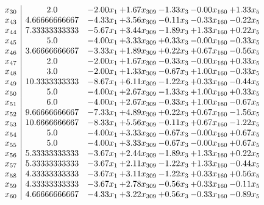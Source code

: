 \documentclass[8pt]{article}
\begin{document}
\[\begin{array}{c| c c@{\hskip 2pt} c@{\hskip 2pt} c@{\hskip 2pt} c@{\hskip 2pt} c@{\hskip 2pt} }
 x_{30}   &  2.0 & -2.00 x_{1} & +  1.67 x_{309} & -1.33 x_{3} & -0.00 x_{160} & +  1.33 x_{5}\\
 x_{43}   &  4.66666666667 & -4.33 x_{1} & +  3.56 x_{309} & -0.11 x_{3} & -0.33 x_{160} & -0.22 x_{5}\\
 x_{44}   &  7.33333333333 & -5.67 x_{1} & +  3.44 x_{309} & -1.89 x_{3} & +  1.33 x_{160} & +  0.22 x_{5}\\
 x_{45}   &  5.0 & -4.00 x_{1} & +  3.33 x_{309} & +  0.33 x_{3} & -0.00 x_{160} & -0.33 x_{5}\\
 x_{46}   &  3.66666666667 & -3.33 x_{1} & +  1.89 x_{309} & +  0.22 x_{3} & +  0.67 x_{160} & -0.56 x_{5}\\
 x_{47}   &  2.0 & -2.00 x_{1} & +  1.67 x_{309} & -0.33 x_{3} & -0.00 x_{160} & +  0.33 x_{5}\\
 x_{48}   &  3.0 & -2.00 x_{1} & +  1.33 x_{309} & -0.67 x_{3} & +  1.00 x_{160} & -0.33 x_{5}\\
 x_{49}   &  10.3333333333 & -8.67 x_{1} & +  6.11 x_{309} & -1.22 x_{3} & +  0.33 x_{160} & -0.44 x_{5}\\
 x_{50}   &  5.0 & -4.00 x_{1} & +  2.67 x_{309} & -1.33 x_{3} & +  1.00 x_{160} & +  0.33 x_{5}\\
 x_{51}   &  6.0 & -4.00 x_{1} & +  2.67 x_{309} & -0.33 x_{3} & +  1.00 x_{160} & -0.67 x_{5}\\
 x_{52}   &  9.66666666667 & -7.33 x_{1} & +  4.89 x_{309} & +  0.22 x_{3} & +  0.67 x_{160} & -1.56 x_{5}\\
 x_{53}   &  10.6666666667 & -8.33 x_{1} & +  5.56 x_{309} & -0.11 x_{3} & +  0.67 x_{160} & -1.22 x_{5}\\
 x_{54}   &  5.0 & -4.00 x_{1} & +  3.33 x_{309} & -0.67 x_{3} & -0.00 x_{160} & +  0.67 x_{5}\\
 x_{55}   &  5.0 & -4.00 x_{1} & +  3.33 x_{309} & -0.67 x_{3} & -0.00 x_{160} & +  0.67 x_{5}\\
 x_{56}   &  5.33333333333 & -3.67 x_{1} & +  2.44 x_{309} & -1.89 x_{3} & +  1.33 x_{160} & +  0.22 x_{5}\\
 x_{57}   &  5.33333333333 & -3.67 x_{1} & +  2.11 x_{309} & -1.22 x_{3} & +  1.33 x_{160} & -0.44 x_{5}\\
 x_{58}   &  4.33333333333 & -3.67 x_{1} & +  3.11 x_{309} & -1.22 x_{3} & +  0.33 x_{160} & +  0.56 x_{5}\\
 x_{59}   &  4.33333333333 & -3.67 x_{1} & +  2.78 x_{309} & -0.56 x_{3} & +  0.33 x_{160} & -0.11 x_{5}\\
 x_{60}   &  4.66666666667 & -4.33 x_{1} & +  3.22 x_{309} & +  0.56 x_{3} & -0.33 x_{160} & -0.89 x_{5}\\

\end{array}\]
\end{document}
